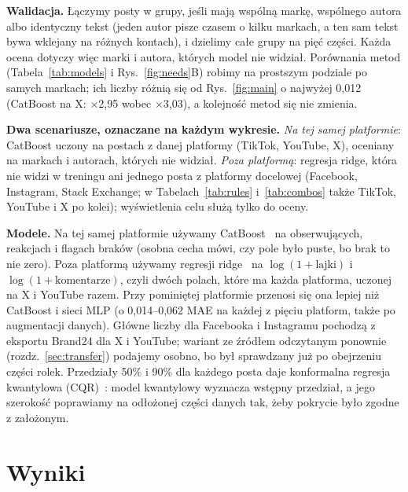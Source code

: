 \documentclass[10pt,a4paper]{article}
\newcommand{\x}[1]{$\times$#1}
\begin{document}
\textbf{Walidacja.} Łączymy posty w grupy, jeśli mają wspólną markę, wspólnego autora albo identyczny tekst (jeden autor
pisze czasem o kilku markach, a ten sam tekst bywa wklejany na różnych kontach), i dzielimy całe grupy na pięć części.
Każda ocena dotyczy więc marki i autora, których model nie widział. Porównania metod (Tabela~\ref{tab:models}
i Rys.~\ref{fig:needs}B) robimy na prostszym podziale po samych markach; ich liczby różnią się od Rys.~\ref{fig:main}
o najwyżej 0,012 (CatBoost na X: \x{2,95} wobec \x{3,03}), a kolejność metod się nie zmienia.

\begin{tcolorbox}[colback=black!3,colframe=black!25,boxrule=.4pt,left=4pt,right=4pt,top=2pt,bottom=2pt]\small
\textbf{Dwa scenariusze, oznaczane na każdym wykresie.} \emph{Na tej samej platformie}: CatBoost uczony na postach z danej
platformy (TikTok, YouTube, X), oceniany na markach i autorach, których nie widział. \emph{Poza platformą}: regresja
ridge, która nie widzi w treningu ani jednego posta z platformy docelowej (Facebook, Instagram, Stack Exchange;
w Tabelach~\ref{tab:rules} i~\ref{tab:combos} także TikTok, YouTube i X po kolei); wyświetlenia celu służą tylko do oceny.
\end{tcolorbox}

\textbf{Modele.} Na tej samej platformie używamy CatBoost~\cite{catboost} na obserwujących, reakcjach i flagach braków
(osobna cecha mówi, czy pole było puste, bo brak to nie zero). Poza platformą używamy regresji ridge~\cite{hoerl1970}
na $\log(1+\text{lajki})$ i $\log(1+\text{komentarze})$, czyli dwóch polach, które ma każda platforma, uczonej na X
i YouTube razem. Przy pominiętej platformie przenosi się ona lepiej niż CatBoost i sieci MLP (o 0,014--0,062 MAE na
każdej z pięciu platform, także po augmentacji danych). Główne liczby dla Facebooka i Instagramu pochodzą z eksportu
Brand24 dla X i YouTube; wariant ze źródłem odczytanym ponownie (rozdz.~\ref{sec:transfer}) podajemy osobno, bo był
sprawdzany już po obejrzeniu części rolek. Przedziały 50\% i 90\% dla każdego posta daje konformalna regresja kwantylowa
(CQR)~\cite{romano2019}: model kwantylowy wyznacza wstępny przedział, a jego szerokość poprawiamy na odłożonej części
danych tak, żeby pokrycie było zgodne z założonym.

\section{Wyniki}\label{sec:wyniki}
\end{document}
